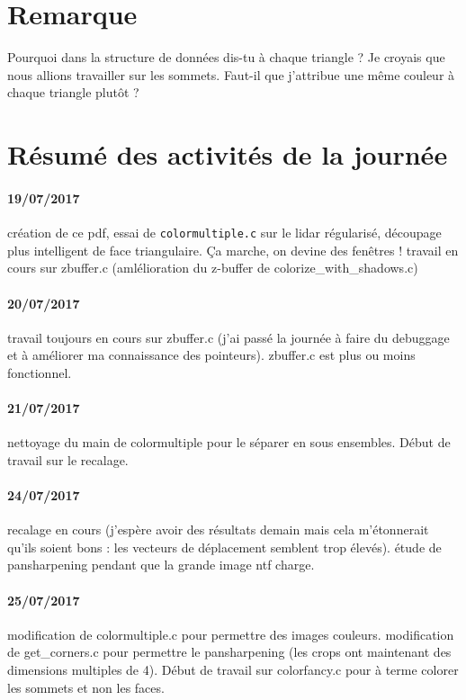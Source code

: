 \documentclass{article}
\begin{document}
\section{Remarque}
Pourquoi dans la structure de données dis-tu à chaque triangle ? Je croyais que nous allions travailler sur les sommets. Faut-il que j'attribue une même couleur à chaque triangle plutôt ? 


\section{Résumé des activités de la journée}
\paragraph{19/07/2017} création de ce pdf, essai de \verb"colormultiple.c" sur le lidar régularisé, découpage plus intelligent de face triangulaire. \c Ca marche, on devine des fenêtres ! travail en cours sur zbuffer.c (amlélioration du z-buffer de colorize\_with\_shadows.c)
\paragraph{20/07/2017}  travail toujours en cours sur zbuffer.c (j'ai passé la journée à faire du debuggage et à améliorer ma connaissance des pointeurs). zbuffer.c est plus ou moins fonctionnel. 
\paragraph{21/07/2017} nettoyage du main de colormultiple pour le séparer en sous ensembles. Début de travail sur le recalage.
\paragraph{24/07/2017} recalage en cours (j'espère avoir des résultats demain mais cela m'étonnerait qu'ils soient bons : les vecteurs de déplacement semblent trop élevés). étude de pansharpening pendant que la grande image ntf charge.
\paragraph{25/07/2017}  modification de colormultiple.c pour permettre des images couleurs. modification de get\_corners.c pour permettre le pansharpening (les crops ont maintenant des dimensions multiples de 4). Début de travail sur colorfancy.c pour à terme colorer les sommets et non les faces. 
\end{document}
